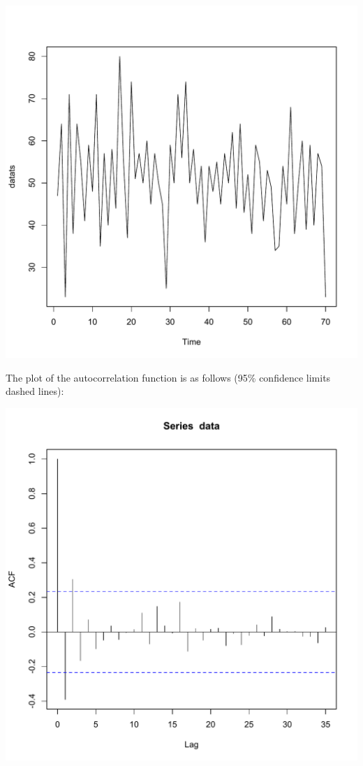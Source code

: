 \documentclass[11pt]{article} %
\begin{document}
\begin{enumerate}
\includegraphics[scale = .4]{plot4.pdf}

The plot of the autocorrelation function is as follows (95\% confidence limits dashed lines): 

\includegraphics[scale = .4]{plot5.pdf}


\end{enumerate}
\end{document}
